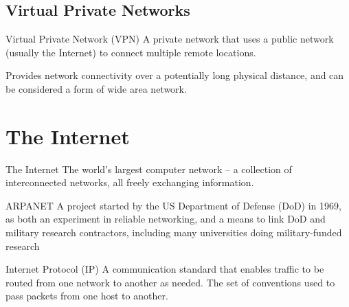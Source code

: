 \documentclass[\main/notes.tex]{subfiles}
\begin{document}
			\subsection{Virtual Private Networks}
				\begin{definition}{Virtual Private Network (VPN)}
					A private network that uses a public network (usually the Internet) to connect multiple remote locations.

					Provides network connectivity over a potentially long physical distance, and can be considered a form of wide area network.
				\end{definition}

		\section{The Internet}
			\begin{definition}{The Internet}
				The world's largest computer network -- a collection of interconnected networks, all freely exchanging information.
			\end{definition}
			\begin{definition}{ARPANET}
				A project started by the US Department of Defense (DoD) in 1969, as both an experiment in reliable networking, and a means to link DoD and military research contractors, including many universities doing military-funded research
			\end{definition}
			\begin{definition}{Internet Protocol (IP)}
				A communication standard that enables traffic to be routed from one network to another as needed. The set of conventions used to pass packets from one host to another.
			\end{definition}
\end{document}
